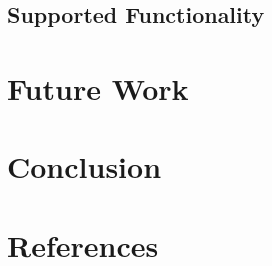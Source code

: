 \documentclass[10pt,a4paper]{article}
\begin{document}
\subsection{Supported Functionality}


\section{Future Work}

\section{Conclusion}

\section{References} %
\end{document}
